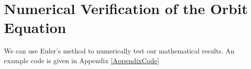 \chapter{Numerical Verification of the Orbit Equation}
We can use Euler's method to numerically test our mathematical results. An example code is given in Appendix \ref{AppendixCode}

